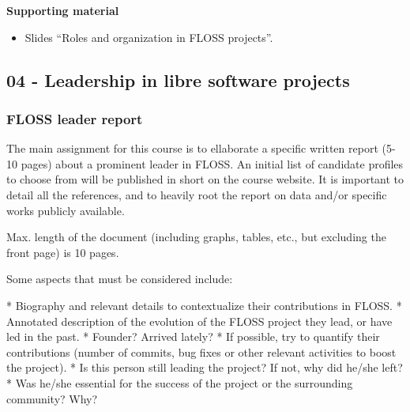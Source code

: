 \documentclass[a4paper]{article}
\begin{document}
\textbf{Supporting material}

\begin{itemize}
\item Slides ``Roles and organization in FLOSS projects''.
\end{itemize}

% 
% 
% 

\subsection{04 - Leadership in libre software projects}


\subsubsection{FLOSS leader report}
\label{sub:floss-leaders}

The main assignment for this course is to ellaborate a specific written report (5-10 pages) about a prominent leader in FLOSS. An initial list of 
candidate profiles to choose from will be published in short on the course website. It is important to detail all the references, and to heavily root 
the report on data and/or specific works publicly available.

Max. length of the document (including graphs, tables, etc., but excluding the front page) is 10 pages.

Some aspects that must be considered include:

    * Biography and relevant details to contextualize their contributions in FLOSS.
    * Annotated description of the evolution of the FLOSS project they lead, or have led in the past.
    * Founder? Arrived lately?
    * If possible, try to quantify their contributions (number of commits, bug fixes or other relevant activities to boost the project).
    * Is this person still leading the project? If not, why did he/she left?
    * Was he/she essential for the success of the project or the surrounding community? Why?
\end{document}
